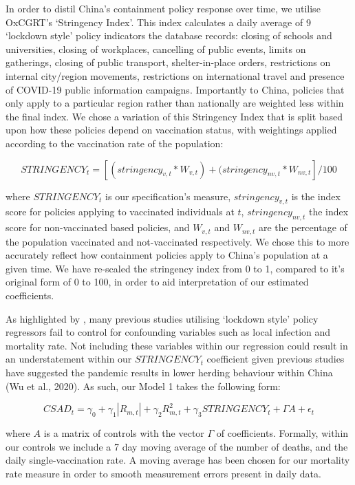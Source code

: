 \documentclass[12pt]{article}
\numberwithin{table}{section}   %
\begin{document}
In order to distil China’s containment policy response over time, we utilise OxCGRT’s ‘Stringency Index’. This index calculates a daily average of 9 ‘lockdown style’ policy indicators the database records: closing of schools and universities, closing of workplaces, cancelling of public events, limits on gatherings, closing of public transport, shelter-in-place orders, restrictions on internal city/region movements, restrictions on international travel and presence of COVID-19 public information campaigns. Importantly to China, policies that only apply to a particular region rather than nationally are weighted less within the final index. We chose a variation of this Stringency Index that is split based upon how these policies depend on vaccination status, with weightings applied according to the vaccination rate of the population:

$$
STRINGENCY_t=[(stringency_{v,t}*W_{v,t})+(stringency_{nv,t}*W_{nv,t}]/100
$$


where $STRINGENCY_t$ is our specification’s measure, $stringency_{v,t}$ is the index score for policies applying to vaccinated individuals at $t$, $stringency_{nv,t}$ the index score for non-vaccinated based policies, and $W_{v,t}$ and $W_{nv,t}$ are the percentage of the population vaccinated and not-vaccinated respectively. We chose this to more accurately reflect how containment policies apply to China’s population at a given time. We have re-scaled the stringency index from 0 to 1, compared to it's original form of 0 to 100, in order to aid interpretation of our estimated coefficients.

As highlighted by \citet{aknin}, many previous studies utilising ‘lockdown style’ policy regressors fail to control for confounding variables such as local infection and mortality rate. Not including these variables within our regression could result in an understatement within our $STRINGENCY_t$ coefficient given previous studies have suggested the pandemic results in lower herding behaviour within China (Wu et al., 2020). As such, our Model 1 takes the following form:

\begin{equation}\label{model-1}
CSAD_t=\gamma_0+\gamma_1 |R_{m,t}|+\gamma_2 R_{m,t}^2+\gamma_3STRINGENCY_t+\Gamma{A}+\epsilon_t
\end{equation}

where $A$ is a matrix of controls with the vector $\Gamma$ of coefficients. Formally, within our controls we include a 7 day moving average of the number of deaths, and the daily single-vaccination rate. A moving average has been chosen for our mortality rate measure in order to smooth measurement errors present in daily data.
\end{document}
